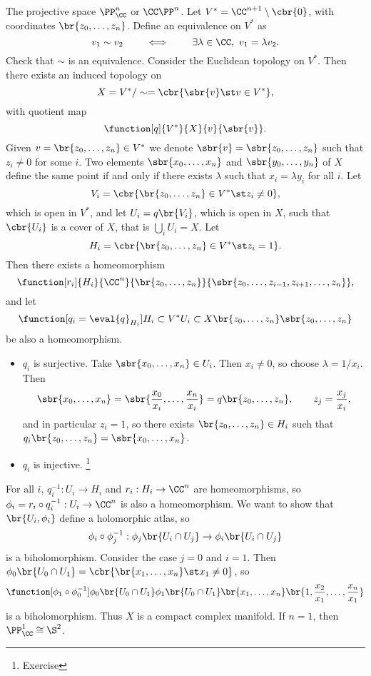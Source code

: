 \begin{example}
The projective space $ \PP_\CC^n $ or $ \CC\PP^n $. Let $ V^* = \CC^{n + 1} \setminus \cbr{0} $, with coordinates $ \br{z_0, \dots, z_n} $. Define an equivalence on $ V^* $ as
$$ v_1 \sim v_2 \qquad \iff \qquad \exists \lambda \in \CC, \ v_1 = \lambda v_2. $$
Check that $ \sim $ is an equivalence. Consider the Euclidean topology on $ V^* $. Then there exists an induced topology on
$$ X = V^* / \sim = \cbr{\sbr{v} \st v \in V^*}, $$
with quotient map
$$ \function[q]{V^*}{X}{v}{\sbr{v}}. $$
Given $ v = \br{z_0, \dots, z_n} \in V^* $ we denote $ \sbr{v} = \sbr{z_0, \dots, z_n} $ such that $ z_i \ne 0 $ for some $ i $. Two elements $ \sbr{x_0, \dots, x_n} $ and $ \sbr{y_0, \dots, y_n} $ of $ X $ define the same point if and only if there exists $ \lambda $ such that $ x_i = \lambda y_i $ for all $ i $. Let
$$ V_i = \cbr{\br{z_0, \dots, z_n} \in V^* \st z_i \ne 0}, $$
which is open in $ V^* $, and let $ U_i = q\br{V_i} $, which is open in $ X $, such that $ \cbr{U_i} $ is a cover of $ X $, that is $ \bigcup_i U_i = X $. Let
$$ H_i = \cbr{\br{z_0, \dots, z_n} \in V^* \st z_i = 1}. $$
Then there exists a homeomorphism
$$ \function[r_i]{H_i}{\CC^n}{\br{z_0, \dots, z_n}}{\sbr{z_0, \dots, z_{i - 1}, z_{i + 1}, \dots, z_n}}, $$
and let
$$ \function[q_i = \eval{q}_{H_i}]{H_i \subset V^*}{U_i \subset X}{\br{z_0, \dots, z_n}}{\sbr{z_0, \dots, z_n}} $$
be also a homeomorphism.

\pagebreak

\begin{itemize}
\item $ q_i $ is surjective. Take $ \sbr{x_0, \dots, x_n} \in U_i $. Then $ x_i \ne 0 $, so choose $ \lambda = 1 / x_i $. Then
$$ \sbr{x_0, \dots, x_n} = \sbr{\dfrac{x_0}{x_i}, \dots, \dfrac{x_n}{x_i}} = q\br{z_0, \dots, z_n}, \qquad z_j = \dfrac{x_j}{x_i}, $$
and in particular $ z_i = 1 $, so there exists $ \br{z_0, \dots, z_n} \in H_i $ such that $ q_i\br{z_0, \dots, z_n} = \sbr{x_0, \dots, x_n} $.
\item $ q_i $ is injective. \footnote{Exercise}
\end{itemize}
For all $ i $, $ q_i^{-1} : U_i \to H_i $ and $ r_i : H_i \to \CC^n $ are homeomorphisms, so $ \phi_i = r_i \circ q_i^{-1} : U_i \to \CC^n $ is also a homeomorphism. We want to show that $ \br{U_i, \phi_i} $ define a holomorphic atlas, so
$$ \phi_i \circ \phi_j^{-1} : \phi_j\br{U_i \cap U_j} \to \phi_i\br{U_i \cap U_j} $$
is a biholomorphism. Consider the case $ j = 0 $ and $ i = 1 $. Then $ \phi_0\br{U_0 \cap U_1} = \cbr{\br{x_1, \dots, x_n} \st x_1 \ne 0} $, so
$$ \function[\phi_1 \circ \phi_0^{-1}]{\phi_0\br{U_0 \cap U_1}}{\phi_1\br{U_0 \cap U_1}}{\br{x_1, \dots, x_n}}{\br{1, \dfrac{x_2}{x_1}, \dots, \dfrac{x_n}{x_1}}} $$
is a biholomorphism. Thus $ X $ is a compact complex manifold. If $ n = 1 $, then $ \PP_\CC^1 \cong \S^2 $.
\end{example}


